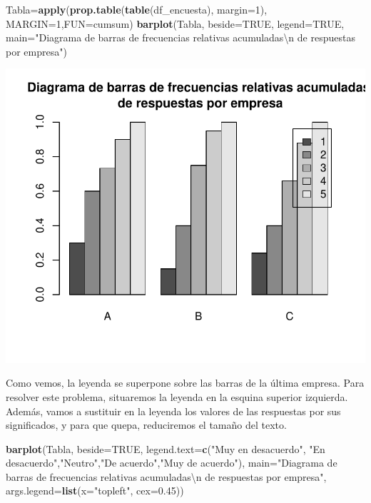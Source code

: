 \documentclass[
]{book}
\newenvironment{Shaded}{\begin{snugshade}}{\end{snugshade}}
\newcommand{\CharTok}[1]{\textcolor[rgb]{0.31,0.60,0.02}{#1}}
\newcommand{\DataTypeTok}[1]{\textcolor[rgb]{0.13,0.29,0.53}{#1}}
\newcommand{\DecValTok}[1]{\textcolor[rgb]{0.00,0.00,0.81}{#1}}
\newcommand{\FloatTok}[1]{\textcolor[rgb]{0.00,0.00,0.81}{#1}}
\newcommand{\KeywordTok}[1]{\textcolor[rgb]{0.13,0.29,0.53}{\textbf{#1}}}
\newcommand{\NormalTok}[1]{#1}
\newcommand{\OtherTok}[1]{\textcolor[rgb]{0.56,0.35,0.01}{#1}}
\newcommand{\StringTok}[1]{\textcolor[rgb]{0.31,0.60,0.02}{#1}}
\theoremstyle{definition}
\theoremstyle{definition}
\theoremstyle{definition}
\theoremstyle{remark}
\begin{document}
\begin{Shaded}
\begin{Highlighting}[]
\NormalTok{Tabla=}\KeywordTok{apply}\NormalTok{(}\KeywordTok{prop.table}\NormalTok{(}\KeywordTok{table}\NormalTok{(df\_encuesta), }\DataTypeTok{margin=}\DecValTok{1}\NormalTok{), }\DataTypeTok{MARGIN=}\DecValTok{1}\NormalTok{,}\DataTypeTok{FUN=}\NormalTok{cumsum)}
\KeywordTok{barplot}\NormalTok{(Tabla, }\DataTypeTok{beside=}\OtherTok{TRUE}\NormalTok{, }\DataTypeTok{legend=}\OtherTok{TRUE}\NormalTok{,}
        \DataTypeTok{main=}\StringTok{"Diagrama de barras de frecuencias relativas acumuladas}\CharTok{\textbackslash{}n}\StringTok{ de respuestas por empresa"}\NormalTok{)}
\end{Highlighting}
\end{Shaded}

\begin{center}\includegraphics[width=0.9\linewidth]{11chap11_Descripcion_ordinales_files/figure-latex/unnamed-chunk-27-1} \end{center}

Como vemos, la leyenda se superpone sobre las barras de la última empresa. Para resolver este problema, situaremos la leyenda en la esquina superior izquierda. Además, vamos a sustituir en la leyenda los valores de las respuestas por sus significados, y para que quepa, reduciremos el tamaño del texto.

\begin{Shaded}
\begin{Highlighting}[]
\KeywordTok{barplot}\NormalTok{(Tabla, }\DataTypeTok{beside=}\OtherTok{TRUE}\NormalTok{, }
        \DataTypeTok{legend.text=}\KeywordTok{c}\NormalTok{(}\StringTok{"Muy en desacuerdo"}\NormalTok{, }\StringTok{"En desacuerdo"}\NormalTok{,}\StringTok{"Neutro"}\NormalTok{,}\StringTok{"De acuerdo"}\NormalTok{,}\StringTok{"Muy de acuerdo"}\NormalTok{), }
        \DataTypeTok{main=}\StringTok{"Diagrama de barras de frecuencias relativas acumuladas}\CharTok{\textbackslash{}n}\StringTok{ de respuestas por empresa"}\NormalTok{,}
        \DataTypeTok{args.legend=}\KeywordTok{list}\NormalTok{(}\DataTypeTok{x=}\StringTok{"topleft"}\NormalTok{, }\DataTypeTok{cex=}\FloatTok{0.45}\NormalTok{))}
\end{Highlighting}
\end{Shaded}
\end{document}
